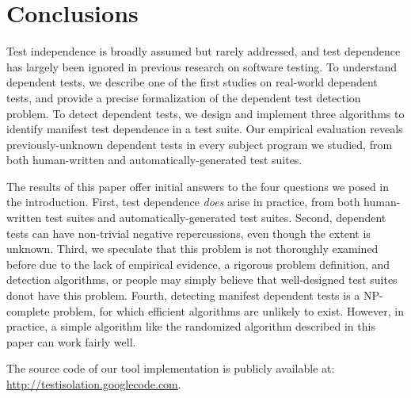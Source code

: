 \section{Conclusions}
\label{sec:questions}

Test independence is broadly assumed but rarely addressed, and
test dependence has largely been ignored in previous
research on software testing. To understand
dependent tests, we describe one of the first studies on
real-world dependent tests, and
provide a precise formalization of the dependent test detection
problem. To detect dependent tests, we design
and implement three algorithms to identify manifest test dependence
in a test suite. Our empirical evaluation reveals
previously-unknown dependent tests in every subject program
we studied, from both human-written and automatically-generated test
suites.

The results of this paper offer initial answers to the four questions we posed
in the introduction. First, test dependence \textit{does}
arise in practice, from both human-written test suites and automatically-generated
test suites. Second, dependent tests can have
non-trivial negative repercussions, even though the
extent is unknown. Third, we speculate that this
problem is not thoroughly examined before due to the
lack of empirical evidence, a rigorous problem definition,
and detection algorithms, or people may simply believe that well-designed
test suites donot have this problem.
Fourth,
detecting manifest dependent tests is a NP-complete problem,
for which efficient algorithms are unlikely to exist. However,
in practice, a simple algorithm like the randomized algorithm
described in this paper can work fairly well.

The source code of our tool implementation is publicly
available at: \url{http://testisolation.googlecode.com}.
